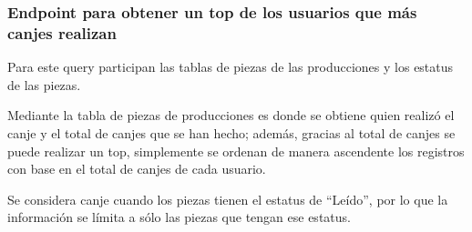 \subsubsection{Endpoint para obtener un top de los usuarios que más canjes realizan}
Para este query participan las tablas de piezas de las producciones y los estatus de las piezas. 

Mediante la tabla de piezas de producciones es donde se obtiene quien realizó el canje y el total de canjes que se han hecho; además, gracias al total de canjes se puede realizar un top, simplemente se ordenan de manera ascendente los registros con base en el total de canjes de cada usuario.

Se considera canje cuando los piezas tienen el estatus de ``Leído'', por lo que la información se límita a sólo las piezas que tengan ese estatus.